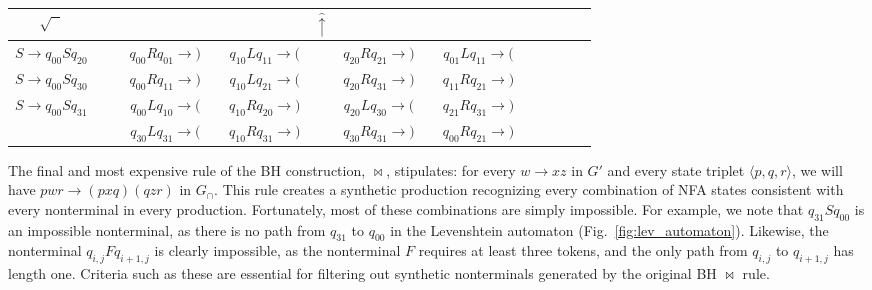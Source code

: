 \documentclass[sigplan,acmsmall,nonacm,screen]{acmart}\settopmatter{printfolios=false,printccs=false,printacmref=false}
\begin{document}
\begin{table}[H]
  \begin{tabular}{cc|ccccccccccccc}
   $\sqrt{\phantom{S}}$ & & & & & & $\hat\uparrow$ & \\\hline
    $S \rightarrow q_{00}Sq_{20}$ & & & $q_{00}Rq_{01} \rightarrow \texttt{)}$ & & $q_{10}Lq_{11} \rightarrow \texttt{(}$ & & $q_{20}Rq_{21} \rightarrow \texttt{)}$ & & $q_{01}Lq_{11} \rightarrow \texttt{(}$ \\
    $S \rightarrow q_{00}Sq_{30}$ & & & $q_{00}Rq_{11} \rightarrow \texttt{)}$ & & $q_{10}Lq_{21} \rightarrow \texttt{(}$ & & $q_{20}Rq_{31} \rightarrow \texttt{)}$ & & $q_{11}Rq_{21} \rightarrow \texttt{)}$ \\
    $S \rightarrow q_{00}Sq_{31}$ & & & $q_{00}Lq_{10} \rightarrow \texttt{(}$ & & $q_{10}Rq_{20} \rightarrow \texttt{)}$ & & $q_{20}Lq_{30} \rightarrow \texttt{(}$ & & $q_{21}Rq_{31} \rightarrow \texttt{)}$ \\
                        & & & $q_{30}Lq_{31} \rightarrow \texttt{(}$ & & $q_{10}Rq_{31} \rightarrow \texttt{)}$ & & $q_{30}Rq_{31} \rightarrow \texttt{)}$ & & $q_{00}Rq_{21} \rightarrow \texttt{)}$
  \end{tabular}
\end{table}\vspace{-8pt}

The final and most expensive rule of the BH construction, $\Join$, stipulates: for every $w \rightarrow xz$ in $G'$ and every state triplet $\langle p, q, r\rangle$, we will have $pwr \rightarrow (pxq)(qzr)$ in $G_\cap$. This rule creates a synthetic production recognizing every combination of NFA states consistent with every nonterminal in every production. Fortunately, most of these combinations are simply impossible. For example, we note that $q_{31}Sq_{00}$ is an impossible nonterminal, as there is no path from $q_{31}$ to $q_{00}$ in the Levenshtein automaton (Fig.~\ref{fig:lev_automaton}). Likewise, the nonterminal $q_{i, j}Fq_{i+1, j}$ is clearly impossible, as the nonterminal $F$ requires at least three tokens, and the only path from $q_{i, j}$ to $q_{i+1, j}$ has length one. Criteria such as these are essential for filtering out synthetic nonterminals generated by the original BH $\Join$ rule.
\end{document}

